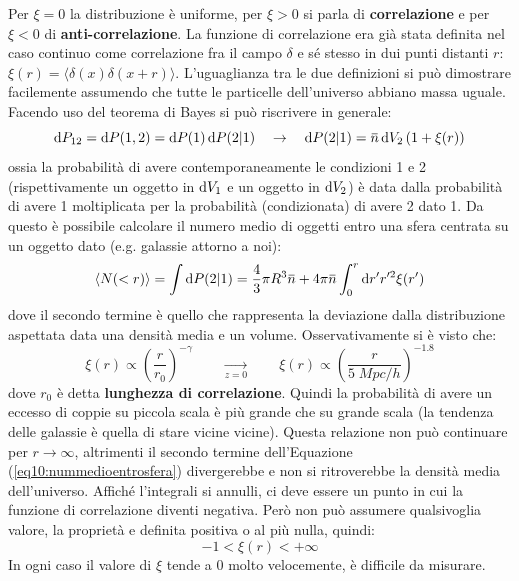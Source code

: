Per $\xi = 0$ la distribuzione è uniforme, per $\xi >0$ si parla di \textbf{correlazione} e per $\xi <0$ di \textbf{anti-correlazione}. La funzione di correlazione era già stata definita nel caso continuo come correlazione fra il campo $\delta$ e sé stesso in dui punti distanti $r$: $\xi (r)=\langle \delta (x)\delta(x+r) \rangle $. L'uguaglianza tra le due definizioni si può dimostrare facilemente assumendo che tutte le particelle dell'universo abbiano massa uguale. Facendo uso del teorema di Bayes si può riscrivere in generale:
\begin{equation}
    \d{P_{12}}= \d{P}(1,2) = \d{P}(1) \d{P}(2|1)\quad \rightarrow \quad \d{P}(2|1)=\overbar{n}\d{V_2}\left(1+\xi(r)\right)
\end{equation}
ossia la probabilità di avere contemporaneamente le condizioni 1 e 2 (rispettivamente un oggetto in $\operatorname{d}\!{V}_1$ e un oggetto in $\operatorname{d}\!{V}_2$) è data dalla probabilità di avere 1 moltiplicata per la probabilità (condizionata) di avere 2 dato 1. Da questo è possibile calcolare il numero medio di oggetti entro una sfera centrata su un oggetto dato (e.g. galassie attorno a noi):
\begin{equation}
    \langle N(<r) \rangle =\int \d{P}(2|1) = \frac{4}{3}\pi R^3 \overbar{n} + 4\pi \overbar{n} \int_0^r \d{r'}r'^2 \xi (r') \label{eq10:nummedioentrosfera}
\end{equation}
dove il secondo termine è quello che rappresenta la deviazione dalla distribuzione aspettata data una densità media e un volume. Osservativamente si è visto che:
$$
\xi(r)\propto \left(\frac{r}{r_0}\right)^{-\gamma} \qquad \xrightarrow[z=0]{} \qquad \xi(r)\propto \left(\frac{r}{5\; Mpc/h}\right)^{-1.8}
$$
dove $r_0$ è detta \textbf{lunghezza di correlazione}. Quindi la probabilità di avere un eccesso di coppie su piccola scala è più grande che su grande scala (la tendenza delle galassie è quella di stare vicine vicine). Questa relazione non può continuare per $r\to \infty$, altrimenti il secondo termine dell'Equazione (\ref{eq10:nummedioentrosfera}) divergerebbe e non si ritroverebbe la densità media dell'universo. Affiché l'integrali si annulli, ci deve essere un punto in cui la funzione di correlazione diventi negativa. Però non può assumere qualsivoglia valore, la proprietà e definita positiva o al più nulla, quindi:
$$
-1 < \xi(r) < +\infty
$$
In ogni caso il valore di $\xi$ tende a $0$ molto velocemente, è difficile da misurare.

